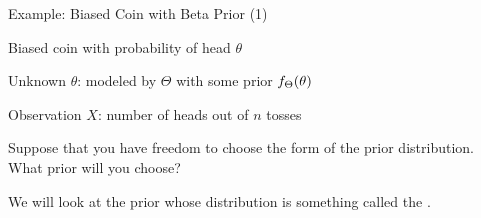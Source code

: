 \begin{frame}{Example: Biased Coin with Beta Prior (1)}

\plitemsep 0.1in
\bci

\item<1-> Biased coin with probability of head $\theta$
\item<2-> Unknown $\theta$: modeled by $\Theta$ with some prior $f_\Theta(\theta)$
\item<3-> Observation $X$: number of heads out of $n$ tosses

\item<4-> \question Suppose that you have freedom to choose the form of the prior
  distribution. What prior will you choose? 

\item<5-> We will look at the prior whose distribution is something
  called the .

\eci




\end{frame}


